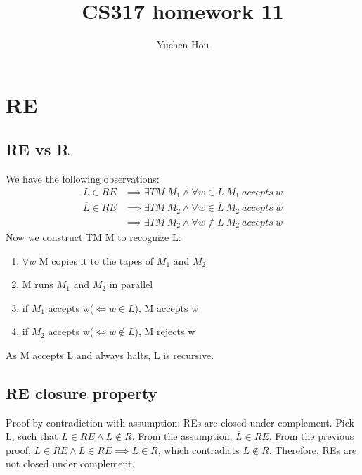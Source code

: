 \documentclass{article}
\begin{document}
\lstset{language=Java}
\title{CS317 homework 11}
\author{Yuchen Hou}
\maketitle

\section{RE}
\subsection{RE vs R}
We have the following observations:
\begin{align*}
L \in RE &\implies \exists TM \ M_1 \land \forall w \in L \ M_1 \ accepts \ w\\
\overline{L} \in RE &\implies \exists TM \ M_2 \land \forall w \in \overline{L}
\ M_2 \ accepts \ w\\
&\implies \exists TM \ M_2 \land \forall w \notin L \ M_2 \ accepts \ w
\end{align*}
Now we construct TM M to recognize L:
\begin{enumerate}
  \item $\forall w$ M copies it to the tapes of $M_1$ and $M_2$
  \item M runs $M_1$ and $M_2$ in parallel
  \item if $M_1 $ accepts w($\iff w \in L$), M accepts w
  \item if $M_2$ accepts w($\iff w \notin L$), M rejects w
\end{enumerate}
As M accepts L and always halts, L is recursive.
\subsection{RE closure property}
Proof by contradiction with assumption: REs are closed under complement. Pick
L, such that $L \in RE \land L\notin R$. From the assumption, $\overline{L} \in
RE$. From the previous proof, $L \in RE \land \overline{L} \in RE \implies L
\in R$, which contradicts $L\notin R$. Therefore, REs are not closed under
complement.
\end{document}
